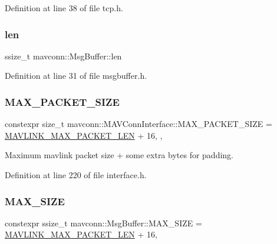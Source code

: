 Definition at line 38 of file tcp.\+h.

\mbox{\label{group__mavconn_ga712063584cbb6fa1ffb3cb30d0b2bd61}} 
\subsubsection{\texorpdfstring{len}{len}}
{\footnotesize\ttfamily ssize\+\_\+t mavconn\+::\+Msg\+Buffer\+::len}



Definition at line 31 of file msgbuffer.\+h.

\mbox{\label{group__mavconn_ga1810847cbd773691c40b73e9ed24455d}} 
\subsubsection{\texorpdfstring{MAX\_PACKET\_SIZE}{MAX\_PACKET\_SIZE}}
{\footnotesize\ttfamily constexpr size\+\_\+t mavconn\+::\+M\+A\+V\+Conn\+Interface\+::\+M\+A\+X\+\_\+\+P\+A\+C\+K\+E\+T\+\_\+\+S\+I\+ZE = \mbox{\hyperlink{include__v2_80_2mavlink__types_8h_a473ed646f44ca10001777e8f150508a6}{M\+A\+V\+L\+I\+N\+K\+\_\+\+M\+A\+X\+\_\+\+P\+A\+C\+K\+E\+T\+\_\+\+L\+EN}} + 16\hspace{0.3cm}{\ttfamily [static]}, {\ttfamily [constexpr]}, {\ttfamily [protected]}}



Maximum mavlink packet size + some extra bytes for padding. 



Definition at line 220 of file interface.\+h.

\mbox{\label{group__mavconn_ga7187a6a6dd41cfe0e92d2c59c81a0010}} 
\subsubsection{\texorpdfstring{MAX\_SIZE}{MAX\_SIZE}}
{\footnotesize\ttfamily constexpr ssize\+\_\+t mavconn\+::\+Msg\+Buffer\+::\+M\+A\+X\+\_\+\+S\+I\+ZE = \mbox{\hyperlink{include__v2_80_2mavlink__types_8h_a473ed646f44ca10001777e8f150508a6}{M\+A\+V\+L\+I\+N\+K\+\_\+\+M\+A\+X\+\_\+\+P\+A\+C\+K\+E\+T\+\_\+\+L\+EN}} + 16\hspace{0.3cm}{\ttfamily [static]}, {\ttfamily [constexpr]}}



